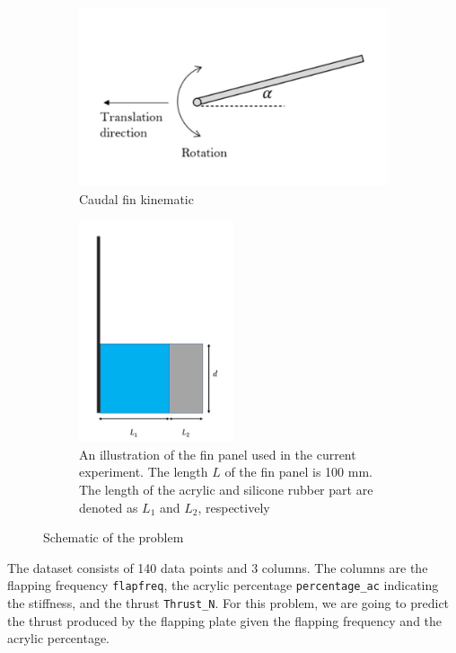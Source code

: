 \documentclass[conf]{new-aiaa}
\begin{document}
\begin{figure}[H]
    \centering
    \begin{subfigure}{0.4\textwidth}
        \includegraphics[width=1.0\textwidth]{graph/case1_problem_1.jpg}
        \caption{Caudal fin kinematic}
    \end{subfigure}
    \begin{subfigure}{0.4\textwidth}
        \includegraphics[width=0.5\textwidth]{graph/case1_problem_2.jpg}
        \caption{An illustration of the fin panel used in the current experiment. The length $L$ of the fin panel is 100 mm. The length of the acrylic and silicone rubber part are denoted as $L_1$ and $L_2$, respectively}
    \end{subfigure}
    \caption{\label{fig:case1_problem} Schematic of the problem}
\end{figure}

The dataset consists of 140 data points and 3 columns. The columns are the flapping frequency \texttt{flapfreq}, the acrylic percentage \texttt{percentage\_ac} indicating the stiffness, and the thrust \texttt{Thrust\_N}. For this problem, we are going to predict the thrust produced by the flapping plate given the flapping frequency and the acrylic percentage.
\end{document}

